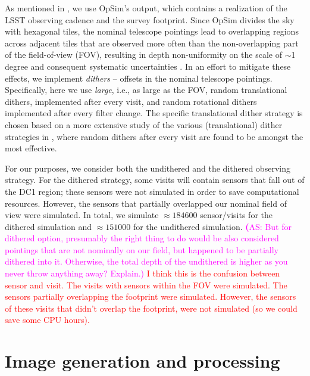 \documentclass[twocolumn]{aastex62}
\newcommand{\as}[1]{{\textcolor{magenta}{{\textbf (AS: #1)}}}}
\begin{document}
As mentioned in , we use OpSim's output, which contains a realization of the LSST observing cadence and the survey footprint. Since OpSim divides the sky with hexagonal tiles, the nominal telescope pointings lead to overlapping regions across adjacent tiles that are observed more often than the non-overlapping part of the field-of-view (FOV), resulting in depth non-uniformity on the scale of $\sim$1 degree and consequent systematic uncertainties \citep{2016ApJ...829...50A}. In an effort to mitigate these effects, we implement \textit{dithers} -- offsets in the nominal telescope pointings. Specifically, here we use \textit{large}, i.e., as large as the FOV, random translational dithers, implemented after every visit, and random rotational dithers implemented after every filter change. The specific translational dither strategy is chosen based on a more extensive study of the various (translational) dither strategies in \citet{2016ApJ...829...50A}, where random dithers after every visit are found to be amongst the most effective.

For our purposes, we consider both the undithered and the dithered observing strategy. For the dithered strategy, some visits will contain sensors that fall out of the DC1 region; these sensors were not simulated in order to save computational resources. However, the sensors that partially overlapped our nominal field of view were simulated. In total, we simulate $\approx 184600$ sensor/visits for the dithered simulation and $\approx 151000$ for the undithered simulation.
\as{But for dithered option, presumably the right thing to do would be also considered pointings that are not nominally on our field, but happened to be partially dithered into it. Otherwise, the total depth of the undithered is higher as you never throw anything away? Explain.} \textcolor{red}{I think this is the confusion between sensor and visit. The visits with sensors within the FOV were simulated. The sensors partially overlapping the footprint were simulated. However, the sensors of these visits that didn't overlap the footprint, were not simulated (so we could save some CPU hours).}



\section{Image generation and processing}
\label{sec:image_generation_pipeline}
\end{document}
